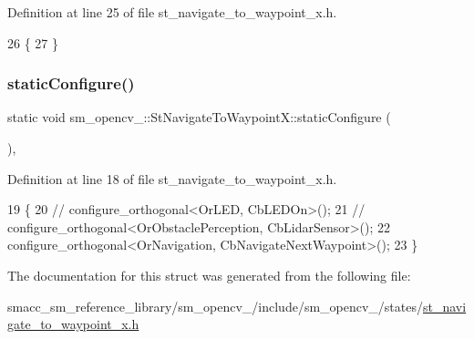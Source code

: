 Definition at line 25 of file st\+\_\+navigate\+\_\+to\+\_\+waypoint\+\_\+x.\+h.


\begin{DoxyCode}
26         \{
27         \}
\end{DoxyCode}
\mbox{\label{structsm__opencv__3_1_1StNavigateToWaypointX_a8b69608e8d962eeb42ca346bde8e810f}} 
\subsubsection{\texorpdfstring{static\+Configure()}{staticConfigure()}}
{\footnotesize\ttfamily static void sm\+\_\+opencv\+\_\+::\+St\+Navigate\+To\+Waypoint\+X\+::static\+Configure (\begin{DoxyParamCaption}{ }\end{DoxyParamCaption})\hspace{0.3cm}{\ttfamily [inline]}, {\ttfamily [static]}}



Definition at line 18 of file st\+\_\+navigate\+\_\+to\+\_\+waypoint\+\_\+x.\+h.


\begin{DoxyCode}
19         \{
20             \textcolor{comment}{// configure\_orthogonal<OrLED, CbLEDOn>();}
21             \textcolor{comment}{// configure\_orthogonal<OrObstaclePerception, CbLidarSensor>();}
22             configure\_orthogonal<OrNavigation, CbNavigateNextWaypoint>();
23         \}
\end{DoxyCode}


The documentation for this struct was generated from the following file\+:\begin{DoxyCompactItemize}
\item 
smacc\+\_\+sm\+\_\+reference\+\_\+library/sm\+\_\+opencv\+\_/include/sm\+\_\+opencv\+\_/states/\hyperlink{3_2include_2sm__opencv__3_2states_2st__navigate__to__waypoint__x_8h}{st\+\_\+navigate\+\_\+to\+\_\+waypoint\+\_\+x.\+h}\end{DoxyCompactItemize}
